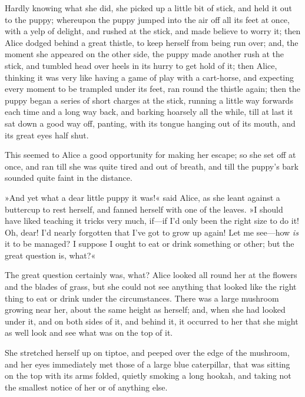 Hardly knowing what she did, she picked up a little bit of stick, and held it out to the puppy; whereupon the puppy jumped into the air off all its feet at once, with a yelp of delight, and rushed at the stick, and made believe to worry it; then Alice dodged behind a great thistle, to keep herself from being run over; and, the moment she appeared on the other side, the puppy made another rush at the stick, and tumbled head over heels in its hurry to get hold of it; then Alice, thinking it was very like having a game of play with a cart-horse, and expecting every moment to be trampled under its feet, ran round the thistle again; then the puppy began a series of short charges at the stick, running a little way forwards each time and a long way back, and barking hoarsely all the while, till at last it sat down a good way off, panting, with its tongue hanging out of its mouth, and its great eyes half shut.

This seemed to Alice a good opportunity for making her escape; so she set off at once, and ran till she was quite tired and out of breath, and till the puppy's bark sounded quite faint in the distance.

»And yet what a dear little puppy it was!« said Alice, as she leant against a buttercup to rest herself, and fanned herself with one of the leaves. »I should have liked teaching it tricks very much, if—if I'd only been the right size to do it! Oh, dear! I'd nearly forgotten that I've got to grow up again! Let me see—how \textit{is} it to be managed? I suppose I ought to eat or drink something or other; but the great question is, what?«

The great question certainly was, what? Alice looked all round her at the flowers and the blades of grass, but she could not see anything that looked like the right thing to eat or drink under the circumstances. There was a large mushroom growing near her, about the same height as herself; and, when she had looked under it, and on both sides of it, and behind it, it occurred to her that she might as well look and see what was on the top of it.

She stretched herself up on tiptoe, and peeped over the edge of the mushroom, and her eyes immediately met those of a large blue caterpillar, that was sitting on the top with its arms folded, quietly smoking a long hookah, and taking not the smallest notice of her or of anything else.